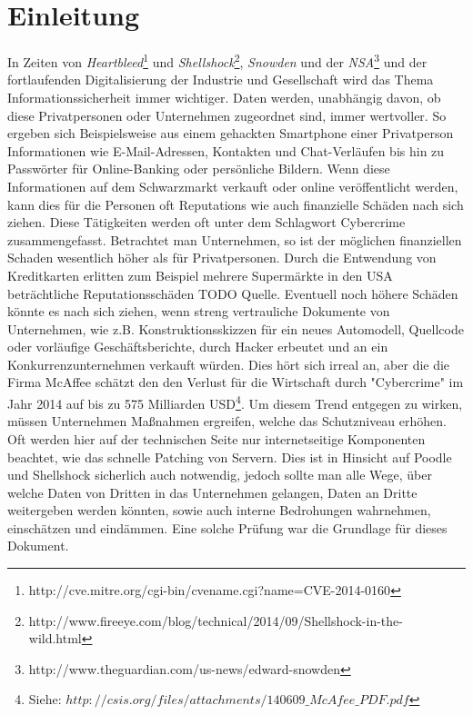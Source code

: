 \chapter{Einleitung}
In Zeiten von \textit{Heartbleed}\footnote{http://cve.mitre.org/cgi-bin/cvename.cgi?name=CVE-2014-0160} und \textit{Shellshock}\footnote{http://www.fireeye.com/blog/technical/2014/09/Shellshock-in-the-wild.html}, \textit{Snowden} und der \textit{NSA}\footnote{http://www.theguardian.com/us-news/edward-snowden} und der fortlaufenden Digitalisierung der Industrie und Gesellschaft wird das Thema Informationssicherheit immer wichtiger. Daten werden, unabhängig davon, ob diese Privatpersonen oder Unternehmen zugeordnet sind, immer wertvoller. So ergeben sich Beispielsweise aus einem gehackten Smartphone einer Privatperson Informationen wie E-Mail-Adressen, Kontakten und Chat-Verläufen bis hin zu Passwörter für Online-Banking oder persönliche Bildern. Wenn diese Informationen auf dem Schwarzmarkt verkauft oder online veröffentlicht werden, kann dies für die Personen oft Reputations wie auch finanzielle Schäden nach sich ziehen. Diese Tätigkeiten werden oft unter dem Schlagwort Cybercrime zusammengefasst. Betrachtet man Unternehmen, so ist der möglichen finanziellen Schaden wesentlich höher als für Privatpersonen. Durch die Entwendung von Kreditkarten erlitten zum Beispiel mehrere Supermärkte in den USA beträchtliche Reputationsschäden TODO Quelle. Eventuell noch höhere Schäden könnte es nach sich ziehen, wenn streng vertrauliche Dokumente von Unternehmen, wie z.B. Konstruktionsskizzen für ein neues Automodell, Quellcode oder vorläufige Geschäftsberichte, durch Hacker erbeutet und an ein Konkurrenzunternehmen verkauft würden. Dies hört sich irreal an, aber die die Firma McAffee schätzt den den Verlust für die Wirtschaft durch "Cybercrime" im Jahr 2014 auf bis zu 575 Milliarden USD\footnote{Siehe: $http://csis.org/files/attachments/140609\_McAfee\_PDF.pdf$}. 
Um diesem Trend entgegen zu wirken, müssen Unternehmen Maßnahmen ergreifen, welche das Schutzniveau erhöhen. Oft werden hier auf der technischen Seite nur internetseitige Komponenten beachtet, wie das schnelle Patching von Servern. Dies ist in Hinsicht auf  Poodle und Shellshock sicherlich auch notwendig, jedoch sollte man alle Wege, über welche Daten von Dritten in das Unternehmen gelangen, Daten an Dritte weitergeben werden könnten, sowie auch interne Bedrohungen wahrnehmen, einschätzen und eindämmen. Eine solche Prüfung war die Grundlage für dieses Dokument.